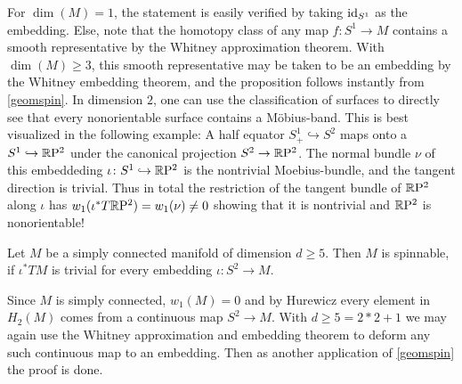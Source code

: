 \prf
    For $\dim(M) = 1$, the statement is easily verified by taking $\operatorname{id}_{S^1}$ as the embedding.
    Else, note that the homotopy class of any map $f\colon S^1 \to M$ contains a smooth representative by the Whitney approximation theorem.
    With $\dim(M)\geq 3$, this smooth representative may be taken to be an embedding by the Whitney embedding theorem, and the proposition follows instantly from \ref{geomspin}.
    In dimension $2$, one can use the classification of surfaces to directly see that every nonorientable surface contains a Möbius-band.
\endprf
This is best visualized in the following example:
A half equator $S_+^1 \hookrightarrow S^2$ maps onto a $S^1 \hookrightarrow \mathbb{R}\mathrm{P}^2$ under the canonical projection $S^2\to \mathbb{R}\mathrm{P}^2$. 
The normal bundle $\nu$ of this embeddeding $\iota\colon S^1\hookrightarrow \mathbb{R}\mathrm{P}^2$ is the nontrivial Moebius-bundle, and the tangent direction is trivial.
Thus in total the restriction of the tangent bundle of $\mathbb{R}\mathrm{P}^2$ along $\iota$ has $w_1(\iota^\ast T\mathbb{R}\mathrm{P}^2) = w_1(\nu) \neq 0$ showing that it is nontrivial and $\mathbb{R}\mathrm{P}^2$ is nonorientable!
\begin{thesisprop}\label{moregeomspin}
    Let $M$ be a simply connected manifold of dimension $d\geq 5$. Then $M$ is spinnable, if $\iota^\ast TM$ is trivial for every embedding $\iota\colon S^2 \to M$.
\end{thesisprop}
\prf
    Since $M$ is simply connected, $w_1(M) = 0$ and by Hurewicz every element in $H_2(M)$ comes from a continuous map $S^2 \to M$.
    With $d\geq 5 = 2* 2 + 1$ we may again use the Whitney approximation and embedding theorem to deform any such continuous map to an embedding. 
    Then as another application of \ref{geomspin} the proof is done.
\endprf

